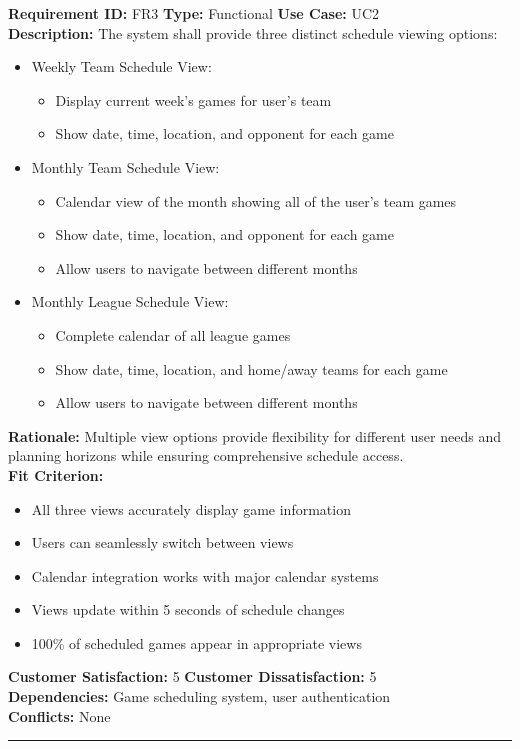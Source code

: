 \documentclass[12pt, titlepage]{article}
\begin{document}
\textbf{Requirement ID:} FR3 \quad \textbf{Type:} Functional \quad \textbf{Use Case:} UC2 \\
\textbf{Description:} The system shall provide three distinct schedule viewing options:
\begin{itemize}
    \item Weekly Team Schedule View:
    \begin{itemize}
        \item Display current week's games for user's team
        \item Show date, time, location, and opponent for each game
    \end{itemize}
    \item Monthly Team Schedule View:
    \begin{itemize}
        \item Calendar view of the month showing all of the user's team games
        \item Show date, time, location, and opponent for each game
        \item Allow users to navigate between different months
    \end{itemize}
    \item Monthly League Schedule View:
    \begin{itemize}
        \item Complete calendar of all league games
        \item Show date, time, location, and home/away teams for each game
        \item Allow users to navigate between different months
    \end{itemize}
\end{itemize}
\textbf{Rationale:} Multiple view options provide flexibility for different user needs and planning horizons while ensuring comprehensive schedule access.\\
\textbf{Fit Criterion:} 
\begin{itemize}
    \item All three views accurately display game information
    \item Users can seamlessly switch between views
    \item Calendar integration works with major calendar systems
    \item Views update within 5 seconds of schedule changes
    \item 100\% of scheduled games appear in appropriate views
\end{itemize}
\textbf{Customer Satisfaction:} 5 \quad\quad \textbf{Customer Dissatisfaction:} 5\\
\textbf{Dependencies:} Game scheduling system, user authentication\\
\textbf{Conflicts:} None\\
\noindent\rule{\textwidth}{1pt}
\end{document}

